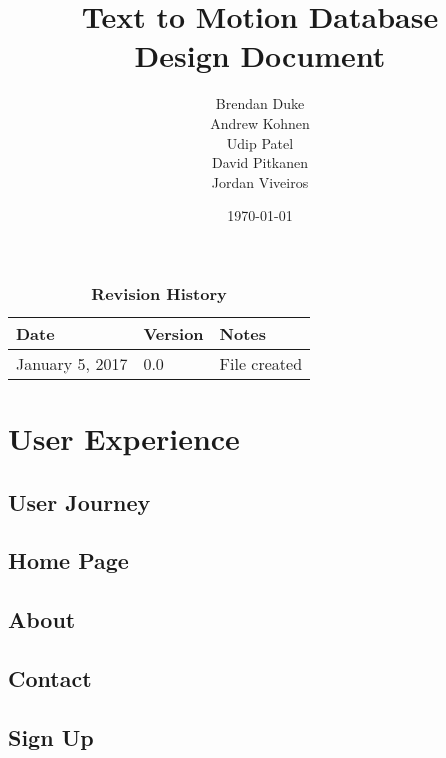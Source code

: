 \documentclass{scrreprt}
\begin{document}
\title{\bf Text to Motion Database\\[\baselineskip]\Large Design Document}
\author{Brendan Duke\\Andrew Kohnen\\Udip Patel\\David Pitkanen\\Jordan Viveiros}
\date{\today}

\maketitle

\tableofcontents


\begin{table}[bp]
\caption*{\bf Revision History}
\begin{tabularx}{\textwidth}{p{3.5cm}p{2cm}X}
\toprule {\bf Date} & {\bf Version} & {\bf Notes}\\
\midrule
January 5, 2017 & 0.0 & File created\\
\bottomrule
\end{tabularx}
\end{table}

\newpage


\chapter{User Experience}

\section{User Journey}

\section{Home Page}

\section{About}

\section{Contact}

\section{Sign Up}
\end{document}
